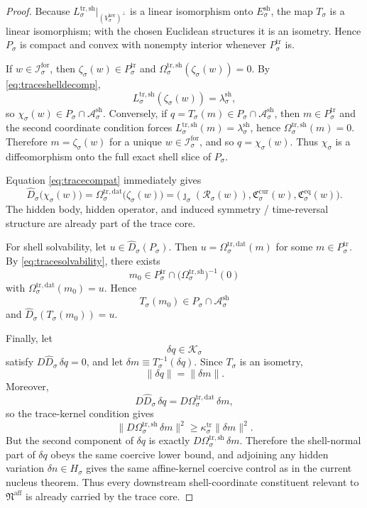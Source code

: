\documentclass[11pt]{article}
\newcommand{\AffineNucleus}{\mathfrak N^{\mathrm{aff}}}
\newcommand{\ForSpace}[1]{\mathcal I_{#1}^{\mathrm{for}}}
\newcommand{\Reduction}[1]{\mathcal R_{#1}}
\newcommand{\CurrentCarrier}[1]{\mathfrak C_{#1}^{\mathrm{cur}}}
\newcommand{\EqCarrier}[1]{\mathfrak C_{#1}^{\mathrm{eq}}}
\newcommand{\GapSpace}[1]{H_{#1}}
\newcommand{\TraceBody}[1]{P_{#1}^{\mathrm{tr}}}
\newcommand{\TraceDataMap}[1]{\Omega_{#1}^{\mathrm{tr,dat}}}
\newcommand{\TraceShellMap}[1]{\Omega_{#1}^{\mathrm{tr,sh}}}
\newcommand{\TraceEmbed}[1]{\zeta_{#1}}
\newcommand{\TraceShellLin}[1]{L_{#1}^{\mathrm{tr,sh}}}
\newcommand{\ShellKer}[1]{V_{#1}^{\mathrm{ker}}}
\newcommand{\ShellNormal}[1]{E_{#1}^{\mathrm{sh}}}
\newcommand{\ShellOffset}[1]{\lambda_{#1}^{\mathrm{sh}}}
\newcommand{\CoordSpace}[1]{\mathcal K_{#1}}
\newcommand{\CoordBody}[1]{P_{#1}}
\newcommand{\CoordIso}[1]{T_{#1}}
\newcommand{\AffineData}[1]{\widehat D_{#1}}
\newcommand{\ShellAffine}[1]{\mathcal A_{#1}^{\mathrm{sh}}}
\newcommand{\ShellEmbed}[1]{\chi_{#1}}
\begin{document}
\begin{proof}
Because \(\TraceShellLin{\sigma}\big|_{(\ShellKer{\sigma})^{\perp}}\) is a linear isomorphism onto \(\ShellNormal{\sigma}\), the map \(\CoordIso{\sigma}\) is a linear isomorphism; with the chosen Euclidean structures it is an isometry. Hence \(\CoordBody{\sigma}\) is compact and convex with nonempty interior whenever \(\TraceBody{\sigma}\) is.

If \(w\in\ForSpace{\sigma}\), then \(\TraceEmbed{\sigma}(w)\in\TraceBody{\sigma}\) and \(\TraceShellMap{\sigma}(\TraceEmbed{\sigma}(w))=0\). By \eqref{eq:traceshelldecomp},
\[
\TraceShellLin{\sigma}(\TraceEmbed{\sigma}(w))
=
\ShellOffset{\sigma},
\]
so \(\ShellEmbed{\sigma}(w)\in\CoordBody{\sigma}\cap\ShellAffine{\sigma}\). Conversely, if \(q=\CoordIso{\sigma}(m)\in\CoordBody{\sigma}\cap\ShellAffine{\sigma}\), then \(m\in\TraceBody{\sigma}\) and the second coordinate condition forces \(\TraceShellLin{\sigma}(m)=\ShellOffset{\sigma}\), hence \(\TraceShellMap{\sigma}(m)=0\). Therefore \(m=\TraceEmbed{\sigma}(w)\) for a unique \(w\in\ForSpace{\sigma}\), and so \(q=\ShellEmbed{\sigma}(w)\). Thus \(\ShellEmbed{\sigma}\) is a diffeomorphism onto the full exact shell slice of \(\CoordBody{\sigma}\).

Equation \eqref{eq:tracecompat} immediately gives
\[
\AffineData{\sigma}\bigl(\ShellEmbed{\sigma}(w)\bigr)
=
\TraceDataMap{\sigma}\bigl(\TraceEmbed{\sigma}(w)\bigr)
=
\bigl(
\jmath_{\sigma}(\Reduction{\sigma}(w)),
\CurrentCarrier{\sigma}(w),
\EqCarrier{\sigma}(w)
\bigr).
\]
The hidden body, hidden operator, and induced symmetry / time-reversal structure are already part of the trace core.

For shell solvability, let \(u\in\AffineData{\sigma}(\CoordBody{\sigma})\). Then \(u=\TraceDataMap{\sigma}(m)\) for some \(m\in\TraceBody{\sigma}\). By \eqref{eq:tracesolvability}, there exists
\[
m_{0}\in
\TraceBody{\sigma}\cap
\bigl(\TraceShellMap{\sigma}\bigr)^{-1}(0)
\]
with \(\TraceDataMap{\sigma}(m_{0})=u\). Hence
\[
\CoordIso{\sigma}(m_{0})\in\CoordBody{\sigma}\cap\ShellAffine{\sigma}
\]
and \(\AffineData{\sigma}(\CoordIso{\sigma}(m_{0}))=u\).

Finally, let
\[
\delta q\in\CoordSpace{\sigma}
\]
satisfy \(D\AffineData{\sigma}\,\delta q=0\), and let \(\delta m\equiv\CoordIso{\sigma}^{-1}(\delta q)\). Since \(\CoordIso{\sigma}\) is an isometry,
\[
\|\delta q\|=\|\delta m\|.
\]
Moreover,
\[
D\AffineData{\sigma}\,\delta q
=
D\TraceDataMap{\sigma}\,\delta m,
\]
so the trace-kernel condition gives
\[
\bigl\|
D\TraceShellMap{\sigma}\,\delta m
\bigr\|^{2}
\ge
\kappa_{\sigma}^{\mathrm{tr}}\|\delta m\|^{2}.
\]
But the second component of \(\delta q\) is exactly \(D\TraceShellMap{\sigma}\,\delta m\). Therefore the shell-normal part of \(\delta q\) obeys the same coercive lower bound, and adjoining any hidden variation \(\delta n\in\GapSpace{\sigma}\) gives the same affine-kernel coercive control as in the current nucleus theorem. Thus every downstream shell-coordinate constituent relevant to \(\AffineNucleus\) is already carried by the trace core.
\end{proof}
\end{document}
